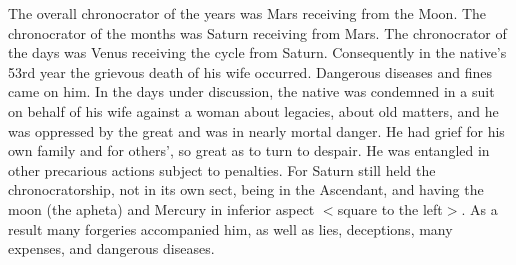 The overall chronocrator of the years was Mars receiving from the Moon. The chronocrator of the months was Saturn receiving from Mars. The chronocrator of the days was Venus receiving the cycle from
Saturn. Consequently in the native’s 53rd year the grievous death of his wife occurred. Dangerous diseases and fines came on him. In the days under discussion, the native was condemned in a suit on behalf of his wife against a woman about legacies, about old matters, and he was oppressed by the great and was in nearly mortal danger. He had grief for his own family and for others’, so great as to turn to despair.
He was entangled in other precarious actions subject to penalties. For Saturn still held the chronocratorship, not in its own sect, being in the Ascendant, and having the moon (the apheta) and Mercury in inferior aspect $<$square to the left$>$. As a result many forgeries accompanied him, as well as lies, deceptions, many expenses, and dangerous diseases.


\newpage